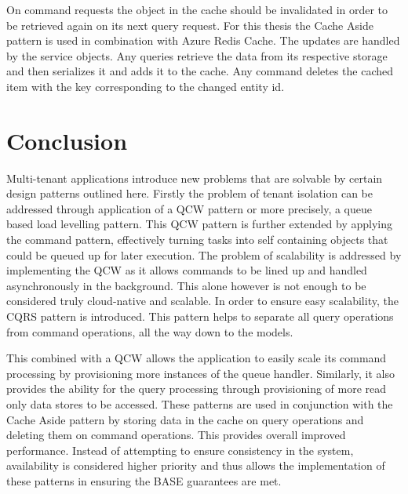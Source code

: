  
On command requests the object in the cache should be invalidated in order to be retrieved again on its next query request. For this thesis the Cache Aside pattern is used in combination with Azure Redis Cache. The updates are handled by the service objects. Any queries retrieve the data from its respective storage and then serializes it and adds it to the cache. Any command deletes the cached item with the key corresponding to the changed entity id.


\section{Conclusion}
 
Multi-tenant applications introduce new problems that are solvable by certain design patterns outlined here. Firstly the problem of tenant isolation can be addressed through application of a QCW pattern or more precisely, a queue based load levelling pattern. This QCW pattern is further extended by applying the command pattern, effectively turning tasks into self containing objects that could be queued up for later execution. The problem of scalability is addressed by implementing the QCW as it allows commands to be lined up and handled asynchronously in the background. This alone however is not enough to be considered truly cloud-native and scalable. In order to ensure easy scalability, the CQRS pattern is introduced. This pattern helps to separate all query operations from command operations, all the way down to the models.
 
This combined with a QCW allows the application to easily scale its command processing by provisioning more instances of the queue handler. Similarly, it also provides the ability for the query processing through provisioning of more read only data stores to be accessed. These patterns are used in conjunction with the Cache Aside pattern by storing data in the cache on query operations and deleting them on command operations. This provides overall improved performance. Instead of attempting to ensure consistency in the system, availability is considered higher priority and thus allows the implementation of these patterns in ensuring the BASE guarantees are met.
